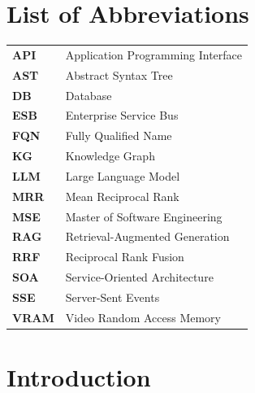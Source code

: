 \documentclass[12pt,a4paper,oneside]{report}
\begin{document}
\newpage

\tableofcontents
\newpage

\listoftables
{}
\newpage

\listoffigures
{}
\newpage

\chapter*{List of Abbreviations}
\begin{singlespace}
\begin{tabular}{ll}
    \textbf{API} & Application Programming Interface \\
    \textbf{AST} & Abstract Syntax Tree \\
    \textbf{DB} & Database \\
    \textbf{ESB} & Enterprise Service Bus \\
    \textbf{FQN} & Fully Qualified Name \\
    \textbf{KG} & Knowledge Graph \\
    \textbf{LLM} & Large Language Model \\
    \textbf{MRR} & Mean Reciprocal Rank \\
    \textbf{MSE} & Master of Software Engineering \\
    \textbf{RAG} & Retrieval-Augmented Generation \\
    \textbf{RRF} & Reciprocal Rank Fusion \\
    \textbf{SOA} & Service-Oriented Architecture \\
    \textbf{SSE} & Server-Sent Events \\
    \textbf{VRAM} & Video Random Access Memory \\
\end{tabular}
\end{singlespace}
\newpage


\chapter{Introduction}
\end{document}
